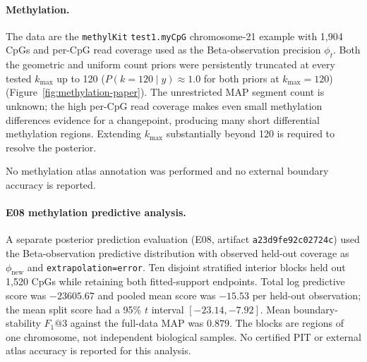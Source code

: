 \paragraph{Methylation.}
The data are the \texttt{methylKit} \texttt{test1.myCpG} chromosome-21 example with 1,904 CpGs and per-CpG read coverage used as the Beta-observation precision $\phi_t$. Both the geometric and uniform count priors were persistently truncated at every tested $k_{\max}$ up to 120 ($P(k=120 \mid y) \approx 1.0$ for both priors at $k_{\max}=120$) (Figure~\ref{fig:methylation-paper}). The unrestricted MAP segment count is unknown; the high per-CpG read coverage makes even small methylation differences evidence for a changepoint, producing many short differential methylation regions. Extending $k_{\max}$ substantially beyond 120 is required to resolve the posterior.

No methylation atlas annotation was performed and no external boundary accuracy is reported.



\paragraph{E08 methylation predictive analysis.}
A separate posterior prediction evaluation (E08, artifact \texttt{a23d9fe92c02724c}) used the Beta-observation predictive distribution with observed held-out coverage as $\phi_{\mathrm{new}}$ and \texttt{extrapolation=error}. Ten disjoint stratified interior blocks held out 1,520 CpGs while retaining both fitted-support endpoints. Total log predictive score was $-23605.67$ and pooled mean score was $-15.53$ per held-out observation; the mean split score had a 95\% $t$ interval $[-23.14, -7.92]$. Mean boundary-stability $F_1@3$ against the full-data MAP was $0.879$. The blocks are regions of one chromosome, not independent biological samples. No certified PIT or external atlas accuracy is reported for this analysis.



\FloatBarrier
